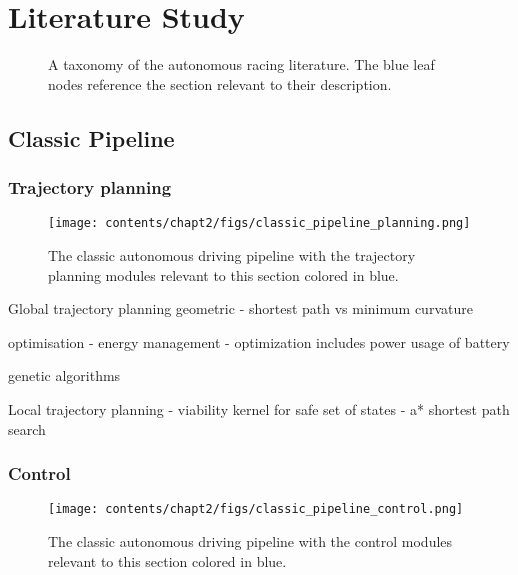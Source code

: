 \chapter{Literature Study}
\label{chp:litreview}


\begin{figure}[htb!]
    \centering
    
    \caption[A taxonomy of the autonomous racing literature with sections]{A taxonomy of the autonomous racing literature. The blue leaf nodes reference the section relevant to their description.}
    \label{fig:my_neuron}
\end{figure}

\section{Classic Pipeline}
\label{sec:classic}

\subsection{Trajectory planning}
\label{sec:trajectory_planning}

\begin{figure}[h]
    \centering
    \texttt{[image: contents/chapt2/figs/classic\_pipeline\_planning.png]}
    \caption{The classic autonomous driving pipeline with the trajectory planning modules relevant to this section colored in blue.}
    \label{fig:trajectory_planning}
\end{figure}

Global trajectory planning
geometric
\cite{Braghin2008} - shortest path vs minimum curvature

optimisation
\cite{Herrmann2019} - energy management
\cite{Herrmann2020} - optimization includes power usage of battery

genetic algorithms
\cite{Cardamone2010}
\cite{Vesel}

Local trajectory planning
\cite{Liniger2015a} - viability kernel for safe set of states
\cite{keefer2022} 
\cite{Wang2021}
\cite{Jeon2013} - a* shortest path search

\subsection{Control}
\label{sec:control}

\begin{figure}[h]
    \centering
    \texttt{[image: contents/chapt2/figs/classic\_pipeline\_control.png]}
    \caption{The classic autonomous driving pipeline with the control modules relevant to this section colored in blue.}
    \label{fig:control}
\end{figure}

